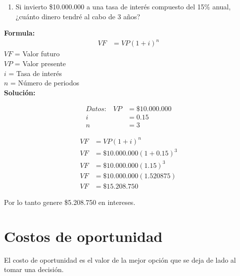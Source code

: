 \documentclass{templateNote}
\begin{document}
\begin{tcolorbox}[colback=blue!10!white,colframe=blue!60!black,title=Ejemplo]
    \begin{enumerate}
        \item Si invierto \$10.000.000 a una tasa de interés compuesto del 15\% anual, ¿cuánto dinero tendré al cabo de 3 años?
    \end{enumerate}
    \textbf{Formula:}
    \begin{align*}
        VF &= VP(1 + i)^n
    \end{align*}
    $VF$ = Valor futuro\\
    $VP$ = Valor presente\\
    $i$ = Tasa de interés\\
    $n$ = Número de periodos\\
    \textbf{Solución:}\\
    \begin{minipage}{0.5\textwidth}
        \begin{align*}
            \textit{Datos:} \quad
            VP &= \$10.000.000\\
            i &= 0.15\\
            n &= 3
        \end{align*}
    \end{minipage}
    \begin{minipage}{0.5\textwidth}
        \begin{align*}
            VF &= VP(1 + i)^n\\
            VF &= \$10.000.000(1 + 0.15)^3\\
            VF &= \$10.000.000(1.15)^3\\
            VF &= \$10.000.000(1.520875)\\
            VF &= \$15.208.750
        \end{align*}
    \end{minipage}
    \center Por lo tanto genere \$5.208.750 en intereses.
\end{tcolorbox}
\newpage

\section{Costos de oportunidad}
\noindent El costo de oportunidad es el valor de la mejor opción que se deja de lado al tomar una decisión.
\end{document}
